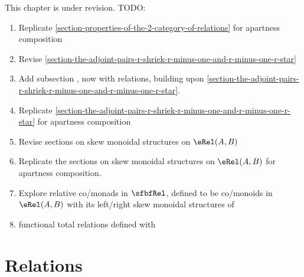 This chapter is under revision. TODO:
\begin{enumerate}
    \item Replicate \cref{section-properties-of-the-2-category-of-relations} for apartness composition
    \item Revise \cref{section-the-adjoint-pairs-r-shriek-r-minus-one-and-r-minus-one-r-star}
    \item Add subsection , now with relations, building upon \cref{section-the-adjoint-pairs-r-shriek-r-minus-one-and-r-minus-one-r-star}.
    \item Replicate \cref{section-the-adjoint-pairs-r-shriek-r-minus-one-and-r-minus-one-r-star} for apartness composition
    \item Revise sections on skew monoidal structures on $\eRel(A,B)$
    \item Replicate the sections on skew monoidal structures on $\eRel(A,B)$ for apartness composition.
    \item Explore relative co/monads in $\sfbfRel$, defined to be co/monoids in $\eRel(A,B)$ with its left/right skew monoidal structures of 
    \item functional total relations defined with 
\end{enumerate}

\ChapterTableOfContents

\section{Relations}\label{section-relations}
